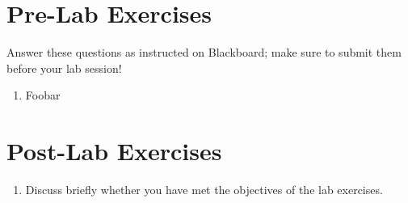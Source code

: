 \documentclass[12pt]{article}
\begin{document}
\newpage

\section*{Pre-Lab Exercises}

Answer these questions as instructed on Blackboard; make sure to
submit them before your lab session!

\begin{enumerate}
\item Foobar
\end{enumerate}

\newpage

\section*{Post-Lab Exercises}

\begin{enumerate}
\item Discuss briefly whether you have met the objectives of the lab
  exercises.
\end{enumerate}
\end{document}

